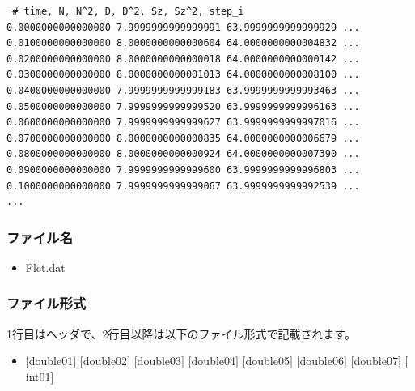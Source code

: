 \begin{minipage}{15cm}
\begin{screen}
\begin{verbatim}
 # time, N, N^2, D, D^2, Sz, Sz^2, step_i
0.0000000000000000 7.9999999999999991 63.9999999999999929 ...
0.0100000000000000 8.0000000000000604 64.0000000000004832 ...
0.0200000000000000 8.0000000000000018 64.0000000000000142 ...
0.0300000000000000 8.0000000000001013 64.0000000000008100 ...
0.0400000000000000 7.9999999999999183 63.9999999999993463 ...
0.0500000000000000 7.9999999999999520 63.9999999999996163 ...
0.0600000000000000 7.9999999999999627 63.9999999999997016 ...
0.0700000000000000 8.0000000000000835 64.0000000000006679 ...
0.0800000000000000 8.0000000000000924 64.0000000000007390 ...
0.0900000000000000 7.9999999999999600 63.9999999999996803 ...
0.1000000000000000 7.9999999999999067 63.9999999999992539 ...
...
\end{verbatim}
\end{screen}
\end{minipage}

\subsubsection{ファイル名}
 \begin{itemize}
   \item Flct.dat
  \end{itemize}

\subsubsection{ファイル形式}
1行目はヘッダで、2行目以降は以下のファイル形式で記載されます。
 \begin{itemize}
   \item $[$double01$]$ $[$double02$]$ $[$double03$]$ $[$double04$]$ $[$double05$]$ $[$double06$]$ $[$double07$]$ $[$int01$]$
  \end{itemize}
